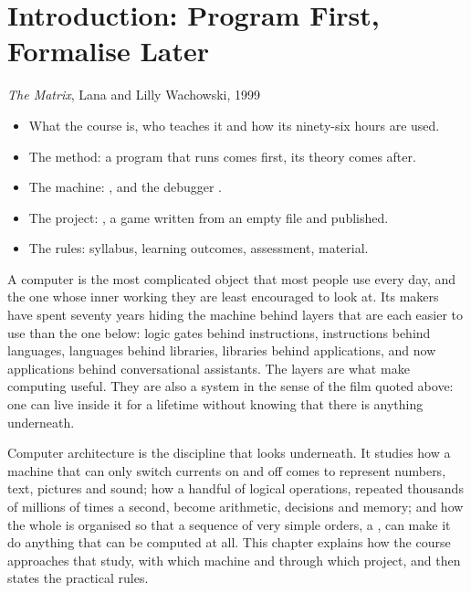 \chapter{Introduction: Program First, Formalise Later}
\label{ch:intro}

  {\emph{The Matrix}, Lana and Lilly Wachowski, 1999}

\begin{chapgoals}
\begin{itemize}
\item What the course is, who teaches it and how its ninety-six hours are used.
\item The method: a program that runs comes first, its theory comes after.
\item The machine: \prg, \riscv and the debugger \prgqt.
\item The project: \vermone, a game written from an empty file and published.
\item The rules: syllabus, learning outcomes, assessment, material.
\end{itemize}
\end{chapgoals}


A computer is the most complicated object that most people use every day, and
the one whose inner working they are least encouraged to look at. Its makers
have spent seventy years hiding the machine behind layers that are each easier
to use than the one below: logic gates behind instructions, instructions behind
languages, languages behind libraries, libraries behind applications, and now
applications behind conversational assistants. The layers are what make
computing useful. They are also a system in the sense of the film quoted
above: one can live inside it for a lifetime without knowing that there is
anything underneath.

Computer architecture is the discipline that looks underneath. It studies how
a machine that can only switch currents on and off comes to represent numbers,
text, pictures and sound; how a handful of logical operations, repeated
thousands of millions of times a second, become arithmetic, decisions and
memory; and how the whole is organised so that a sequence of very simple
orders, a , can make it do anything that can be computed at all.
This chapter explains how the course approaches that study, with which machine
and through which project, and then states the practical rules.


